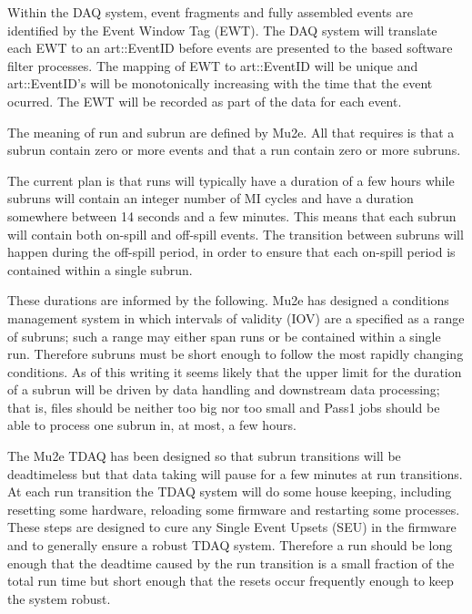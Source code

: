 Within the DAQ system, event fragments and fully assembled events
are identified by the Event Window Tag (EWT).
The DAQ system will translate each EWT to an {\code art::EventID}
before events are presented to the \art based software filter processes.
The mapping of EWT to  {\code art::EventID} will be unique and
{\code art::EventID}'s will be monotonically increasing with the time
that the event ocurred.
The EWT will be recorded as part of the \art data for each event.



The meaning of run and subrun are defined by Mu2e.
All that \art requires is that a subrun contain zero or more
events and that a run contain zero or more subruns.

The current plan is that runs will typically have a duration of a few hours
while subruns will contain an integer number of MI cycles and
have a duration somewhere between 14 seconds and a few minutes.
This means that each subrun will contain both on-spill and
off-spill events.
The transition between subruns will happen during the off-spill period,
in order to ensure that each on-spill period is contained within a single subrun.

These durations are informed by the following.
Mu2e has designed a conditions management system
in which intervals of validity (IOV) are a specified as a range of subruns;
such a range may either span runs or be contained within a single run.
Therefore subruns must be short enough to follow the most
rapidly changing conditions.  As of this writing it seems
likely that the upper limit for the duration of a subrun will
be driven by data handling and downstream data processing;
that is, files should be neither too big nor too small
and  Pass1 jobs should be able to process one subrun
in, at most, a few hours.

The Mu2e TDAQ has been designed so that subrun transitions will be deadtimeless
but that data taking will pause for a few minutes at run transitions.
At each run transition the TDAQ system will do some house keeping,
including resetting some hardware, reloading some firmware and restarting some processes.
These steps are designed to cure any Single Event Upsets (SEU) in the firmware
and to generally ensure a robust TDAQ system.
Therefore a run should be long enough that the deadtime
caused by the run transition is a small fraction of the total run time
but short enough that the resets occur frequently enough
to keep the system robust.

